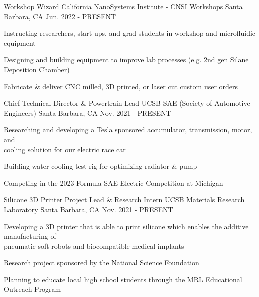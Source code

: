 

\begin{cventries}

\cventry
{Workshop Wizard} %
{California NanoSystems Institute - CNSI Workshops} %
{Santa Barbara, CA} %
{Jun. 2022 - PRESENT} %
{ %
\begin{cvitems}
\item {Instructing researchers, start-ups, and grad students in workshop and microfluidic equipment}
\item {Designing and building equipment to improve lab processes (e.g. 2nd gen Silane Deposition Chamber)}
\item {Fabricate \& deliver CNC milled, 3D printed, or laser cut custom user orders }
\end{cvitems}
}


\cventry
{Chief Technical Director \& Powertrain Lead} %
{UCSB SAE (Society of Automotive Engineers)} %
{Santa Barbara, CA} %
{Nov. 2021 - PRESENT} %
{ %
\begin{cvitems}   
\item {Researching and developing a Tesla sponsored accumulator, transmission, motor, and \\ cooling solution for our electric race car}
\item {Building water cooling test rig for optimizing radiator \& pump}
\item {Competing in the 2023 Formula SAE Electric Competition at Michigan}
\end{cvitems}
}



\cventry
{Silicone 3D Printer Project Lead \& Research Intern} %
{UCSB Materials Research Laboratory} %
{Santa Barbara, CA} %
{Nov. 2021 - PRESENT} %
{ %
\begin{cvitems}
\item {Developing a 3D printer that is able to print silicone which enables the additive manufacturing of \\ pneumatic soft robots and biocompatible medical implants}
\item {Research project sponsored by the National Science Foundation}
\item {Planning to educate local high school students through the MRL Educational Outreach Program}
\end{cvitems}
}


\end{cventries}
